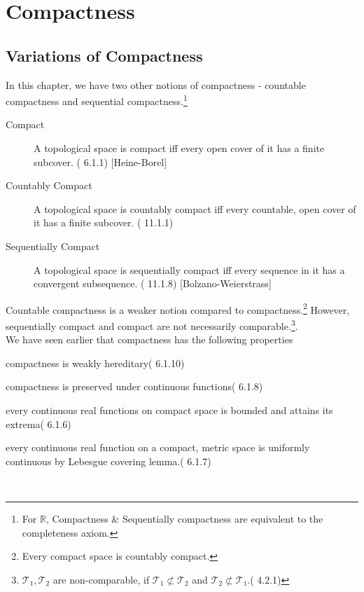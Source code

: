 \chapter{Compactness}
\section{Variations of Compactness}
	In this chapter, we have two other notions of compactness - countable compactness and sequential compactness.\footnote{For $\mathbb{R}$, Compactness \& Sequentially compactness are equivalent to the completeness axiom.}

	\begin{description}
		\item[Compact] A topological space is compact iff every open cover of it has a finite subcover. (\cite{joshi} 6.1.1) [Heine-Borel]
		\item[Countably Compact] A topological space is countably compact iff every countable, open cover of it has a finite subcover. (\cite{joshi} 11.1.1)
		\item[Sequentially Compact] A topological space is sequentially compact iff every sequence in it has a convergent subsequence. (\cite{joshi} 11.1.8) [Bolzano-Weierstrass]
	\end{description}

	Countable compactness is a weaker notion compared to compactness.\footnote{Every compact space is countably compact.} However, sequentially compact and compact are not necessarily comparable.\footnote{$\mathcal{T}_1, \mathcal{T}_2$ are non-comparable, if $\mathcal{T}_1 \not\subset \mathcal{T}_2$ and $\mathcal{T}_2 \not\subset \mathcal{T}_1$.(\cite{joshi} 4.2.1)}.\\

	We have seen earlier that compactness has the following properties
\begin{enumerate*}
	\item compactness is weakly hereditary(\cite{joshi} 6.1.10)
	\item compactness is preserved under continuous functions(\cite{joshi} 6.1.8)
	\item every continuous real functions on compact space is bounded and attains its extrema(\cite{joshi} 6.1.6)
	\item every continuous real function on a compact, metric space is uniformly continuous by Lebesgue covering lemma.(\cite{joshi} 6.1.7)
\end{enumerate*}\\

